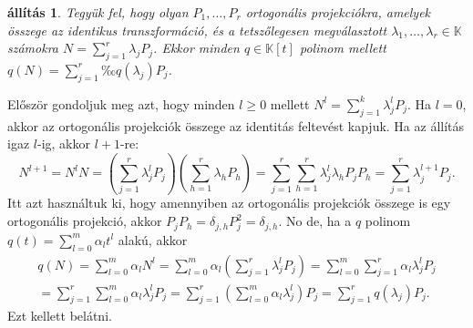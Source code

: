 \documentclass[9pt, a4paper, showtrims]{memoir}
\makeatletter
\renewenvironment{proof}[1][\proofname]
    {\par\pushQED{\qed}%
    \normalfont \topsep6\p@\@plus6\p@\relax
    \trivlist
    \item[\hskip\labelsep
        \itshape
    #1\@addpunct{:}]\ignorespaces}
    {\popQED\endtrivlist\@endpefalse}
\theoremstyle{plain}
\newtheorem{proposition}{állítás}[chapter]
\theoremstyle{remark}
\theoremstyle{definition}
\makeatother
\begin{document}
\begin{proposition}\label{pr:normpol}
    Tegyük fel, hogy olyan 
    $P_1,\dots,P_r$ ortogonális projekciókra, amelyek összege az identikus transzformáció,
    és a tetszőlegesen megválasztott 
    $\lambda_1,\dots,\lambda_r\in\mathbb{K}$ számokra $N=\sum_{j=1}^r\lambda_jP_j$.
    Ekkor minden $q\in\mathbb{K}[t]$ polinom mellett
    $q\left( N \right)=\sum_{j=1}^rq\left( \lambda_j \right)P_j$.
\end{proposition}
\begin{proof}
    Először gondoljuk meg azt, hogy minden $l\geq 0$ mellett
    \begin{math}
        N^l
        =
        \sum_{j=1}^k\lambda_j^lP_j.
    \end{math}
Ha $l=0$, akkor az ortogonális projekciók összege az identitás feltevést kapjuk.
Ha az állítás igaz $l$-ig, akkor $l+1$-re:
\[
    N^{l+1}
    =
    N^lN
    =
    (\sum_{j=1}^r\lambda_j^lP_j)\left( \sum_{h=1}^r\lambda_hP_h \right)
    =
    \sum_{j=1}^r\sum_{h=1}^r\lambda_j^l\lambda_hP_jP_h
    =
    \sum_{j=1}^r\lambda_j^{l+1}P_j.
\]
Itt azt használtuk ki, hogy amennyiben az ortogonális projekciók összege is egy ortogonális projekció,
akkor $P_jP_h=\delta_{j,h}P_j^2=\delta_{j,h}$.
No de, ha a $q$ polinom $q\left( t \right)=\sum_{l=0}^m\alpha_lt^l$ alakú,
akkor
\begin{multline*}
    q\left( N \right)
    =
    \sum_{l=0}^m\alpha_lN^l
    =
    \sum_{l=0}^m\alpha_l
    \left( 
        \sum_{j=1}^r\lambda_j^lP_j
    \right)
    =
    \sum_{l=0}^m\sum_{j=1}^r\alpha_l\lambda_j^lP_j
    \\
    =
    \sum_{j=1}^r\sum_{l=0}^m\alpha_l\lambda_j^lP_j
    =
    \sum_{j=1}^r
        \left( 
            \sum_{l=0}^m\alpha_l\lambda_j^l
        \right)P_j
    =
    \sum_{j=1}^r
        q\left(\lambda_j \right)P_j.
\end{multline*}
Ezt kellett belátni. 
\end{proof}
\end{document}
